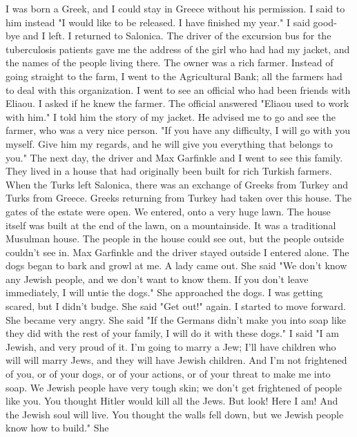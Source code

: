 
I was born a Greek, and I could stay in Greece without his permission. I said 
to him instead "I would like to be released. I have finished my year." I said good-
bye and I left. 
I returned to Salonica. The driver of the excursion bus for the tuberculosis patients gave me 
the address of the girl who had had my jacket, and the names of the people living there. 
The owner was a rich farmer. Instead of going straight to the farm, I went to the Agricultural Bank; all the farmers had to deal with this organization. I went to see an 
official who had been friends with Eliaou. I asked if he knew the farmer. The official 
answered "Eliaou used to work with him." I told him the story of my jacket. He advised 
me to go and see the farmer, who was a very nice person. "If you have any difficulty, 
I will go with you myself. Give him my regards, and he will give you everything that 
belongs to you." 
The next day, the driver and Max Garfinkle and I went to see this family. They 
lived in a house that had originally been built for rich Turkish farmers. When the Turks 
left Salonica, there was an exchange of Greeks from Turkey and Turks from Greece. Greeks 
returning from Turkey had taken over this house. The gates of the estate were open. 
We entered, onto a very huge lawn. The house itself was built at the end of the lawn, on 
a mountainside. It was a traditional Musulman house. The people in the house could see 
out, but the people outside couldn't see in. Max Garfinkle and the driver stayed outside 
I entered alone. The dogs began to bark and growl at me. 
A lady came out. She said "We don't know any Jewish people, and we don't want to 
know them. If you don't leave immediately, I will untie the dogs." She approached the 
dogs. I was getting scared, but I didn't budge. She said 
"Get out!" again. I started 
to move forward. She became very angry. She said "If the Germans didn't make you into 
soap like they did with the rest of your family, I will do it with these dogs." 
I said "I am Jewish, and very proud of it. I'm going to marry a Jew; I'll have children who will 
will marry Jews, and they will have Jewish children. And I'm not frightened of 
you, or of your dogs, or of your actions, or of your threat to make me into soap. We 
Jewish people have very tough skin; we don't get frightened of people like you. You 
thought Hitler would kill all the Jews. But look! Here I am! And the Jewish soul will 
live. You thought the walls fell down, but we Jewish people know how to build." She 
